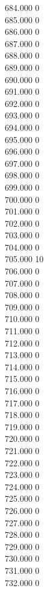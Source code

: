 { 684.000	0 \\
 685.000	0 \\
 686.000	0 \\
 687.000	0 \\
 688.000	0 \\
 689.000	0 \\
 690.000	0 \\
 691.000	0 \\
 692.000	0 \\
 693.000	0 \\
 694.000	0 \\
 695.000	0 \\
 696.000	0 \\
 697.000	0 \\
 698.000	0 \\
 699.000	0 \\
 700.000	0 \\
 701.000	0 \\
 702.000	0 \\
 703.000	0 \\
 704.000	0 \\
 705.000	10 \\
 706.000	0 \\
 707.000	0 \\
 708.000	0 \\
 709.000	0 \\
 710.000	0 \\
 711.000	0 \\
 712.000	0 \\
 713.000	0 \\
 714.000	0 \\
 715.000	0 \\
 716.000	0 \\
 717.000	0 \\
 718.000	0 \\
 719.000	0 \\
 720.000	0 \\
 721.000	0 \\
 722.000	0 \\
 723.000	0 \\
 724.000	0 \\
 725.000	0 \\
 726.000	0 \\
 727.000	0 \\
 728.000	0 \\
 729.000	0 \\
 730.000	0 \\
 731.000	0 \\
 732.000	0 \\
}
